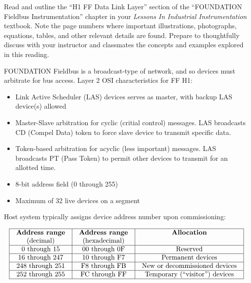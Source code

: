

Read and outline the ``H1 FF Data Link Layer'' section of the ``FOUNDATION Fieldbus Instrumentation'' chapter in your {\it Lessons In Industrial Instrumentation} textbook.  Note the page numbers where important illustrations, photographs, equations, tables, and other relevant details are found.  Prepare to thoughtfully discuss with your instructor and classmates the concepts and examples explored in this reading.














FOUNDATION Fieldbus is a broadcast-type of network, and so devices must arbitrate for bus access.  Layer 2 OSI characteristics for FF H1:

\begin{itemize}
\item{} Link Active Scheduler (LAS) devices serves as master, with backup LAS device(s) allowed
\item{} Master-Slave arbitration for cyclic (critial control) messages.  LAS broadcasts CD (Compel Data) token to force slave device to transmit specific data.
\item{} Token-based arbitration for acyclic (less important) messages.  LAS broadcasts PT (Pass Token) to permit other devices to transmit for an allotted time.
\item{} 8-bit address field (0 through 255)
\item{} Maximum of 32 live devices on a segment
\end{itemize}

Host system typically assigns device address number upon commissioning:


$$\vbox{\offinterlineskip
\halign{\strut
\vrule \quad\hfil # \ \hfil & 
\vrule \quad\hfil # \ \hfil & 
\vrule \quad\hfil # \ \hfil \vrule \cr
\noalign{\hrule}
%
{\bf Address range} & {\bf Address range} & {\bf Allocation} \cr
(decimal) & (hexadecimal) &  \cr
%
\noalign{\hrule}
%
0 through 15 & 00 through 0F & Reserved \cr
%
\noalign{\hrule}
%
16 through 247 & 10 through F7 & Permanent devices \cr
%
\noalign{\hrule}
%
248 through 251 & F8 through FB & New or decommissioned devices \cr
%
\noalign{\hrule}
%
252 through 255 & FC through FF & Temporary (``visitor'') devices \cr
%
\noalign{\hrule}
} %
}$$ %

